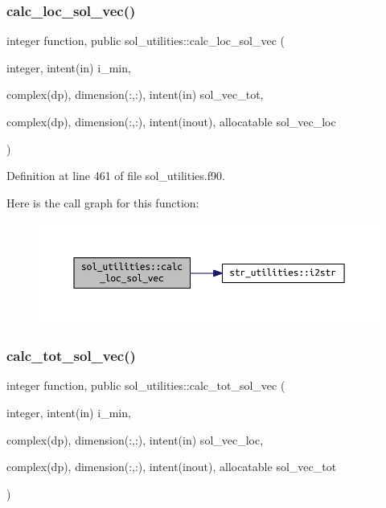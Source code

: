 \subsubsection{\texorpdfstring{calc\+\_\+loc\+\_\+sol\+\_\+vec()}{calc\_loc\_sol\_vec()}}
{\footnotesize\ttfamily integer function, public sol\+\_\+utilities\+::calc\+\_\+loc\+\_\+sol\+\_\+vec (\begin{DoxyParamCaption}\item[{integer, intent(in)}]{i\+\_\+min,  }\item[{complex(dp), dimension(\+:,\+:), intent(in)}]{sol\+\_\+vec\+\_\+tot,  }\item[{complex(dp), dimension(\+:,\+:), intent(inout), allocatable}]{sol\+\_\+vec\+\_\+loc }\end{DoxyParamCaption})}



Definition at line 461 of file sol\+\_\+utilities.\+f90.

Here is the call graph for this function\+:
\nopagebreak
\begin{figure}[H]
\begin{center}
\leavevmode
\includegraphics[width=350pt]{namespacesol__utilities_ab58942363de62344fba9faa1d3c95be5_cgraph}
\end{center}
\end{figure}
\mbox{\label{namespacesol__utilities_ad23f2a5293e2d7caf78be4d8fdf5a06d}} 
\subsubsection{\texorpdfstring{calc\+\_\+tot\+\_\+sol\+\_\+vec()}{calc\_tot\_sol\_vec()}}
{\footnotesize\ttfamily integer function, public sol\+\_\+utilities\+::calc\+\_\+tot\+\_\+sol\+\_\+vec (\begin{DoxyParamCaption}\item[{integer, intent(in)}]{i\+\_\+min,  }\item[{complex(dp), dimension(\+:,\+:), intent(in)}]{sol\+\_\+vec\+\_\+loc,  }\item[{complex(dp), dimension(\+:,\+:), intent(inout), allocatable}]{sol\+\_\+vec\+\_\+tot }\end{DoxyParamCaption})}



